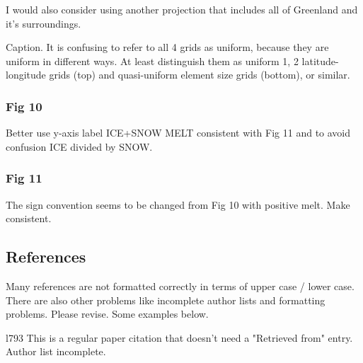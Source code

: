 \documentclass[12pt,oneside,a4paper]{article}%
\begin{document}
{\color{blue}{Thinned the lines by half and changed the lake colors to tan/land.}} \newline

I would also consider using another projection that includes all of Greenland and it's surroundings. \newline

{\color{blue}{We have decided to keep the original polar projection, in order to show the polar points and Greenland.}} \newline

Caption. It is confusing to refer to all 4 grids as uniform, because they are uniform in different ways. At least distinguish them as uniform 1, 2 latitude-longitude grids (top) and quasi-uniform element size grids (bottom), or similar. \newline

{\color{blue}{Changed to new labeling discussed above.}}

\subsubsection*{Fig 10}
Better use y-axis label ICE+SNOW MELT consistent with Fig 11 and to avoid confusion ICE divided by SNOW. \newline

{\color{blue}{Done.}} \newline

\subsubsection*{Fig 11}
The sign convention seems to be changed from Fig 10 with positive melt. Make consistent. \newline

{\color{blue}{Done.}} \newline

\subsection*{References}

Many references are not formatted correctly in terms of upper case / lower case. There are also other problems like incomplete author lists and formatting problems. Please revise. Some examples below. \newline

l793 This is a regular paper citation that doesn't need a "Retrieved from" entry. Author list incomplete. \newline
\end{document}
